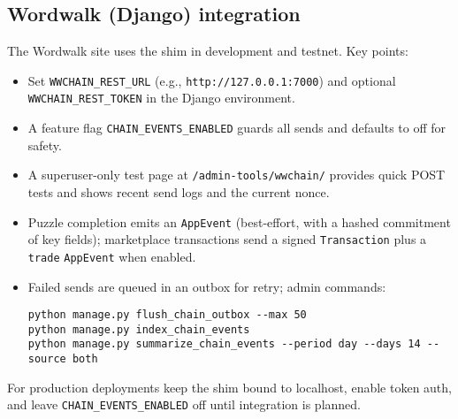 \subsection{Wordwalk (Django) integration}
The Wordwalk site uses the shim in development and testnet. Key points:
\begin{itemize}
\item Set \texttt{WWCHAIN\_REST\_URL} (e.g., \texttt{http://127.0.0.1:7000}) and optional \texttt{WWCHAIN\_REST\_TOKEN} in the Django environment.
\item A feature flag \texttt{CHAIN\_EVENTS\_ENABLED} guards all sends and defaults to off for safety.
\item A superuser-only test page at \texttt{/admin-tools/wwchain/} provides quick POST tests and shows recent send logs and the current nonce.
\item Puzzle completion emits an \texttt{AppEvent} (best-effort, with a hashed commitment of key fields); marketplace transactions send a signed \texttt{Transaction} plus a \texttt{trade} \texttt{AppEvent} when enabled.
\item Failed sends are queued in an outbox for retry; admin commands:
\begin{verbatim}
python manage.py flush_chain_outbox --max 50
python manage.py index_chain_events
python manage.py summarize_chain_events --period day --days 14 --source both
\end{verbatim}
\end{itemize}

For production deployments keep the shim bound to localhost, enable token auth, and leave \texttt{CHAIN\_EVENTS\_ENABLED} off until integration is planned.

